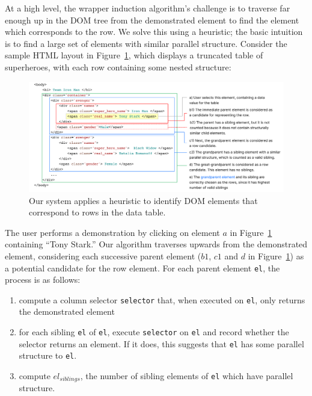 \documentclass[sigconf,10pt]{acmart}
\providecommand{\tightlist}{%
  \setlength{\itemsep}{0pt}\setlength{\parskip}{0pt}}
\begin{document}
At a high level, the wrapper induction algorithm's challenge is to
traverse far enough up in the DOM tree from the demonstrated element to
find the element which corresponds to the row. We solve this using a
heuristic; the basic intuition is to find a large set of elements with
similar parallel structure. Consider the sample HTML layout in
Figure~\ref{fig:algorithm}, which displays a truncated table of
superheroes, with each row containing some nested structure:

\begin{figure}
  \includegraphics[width=\textwidth]{media/algorithm.png}
  \caption{\label{fig:algorithm}Our system applies a heuristic to identify DOM elements that correspond to rows in the data table.}
\end{figure}

The user performs a demonstration by clicking on element \(a\) in
Figure~\ref{fig:algorithm} containing ``Tony Stark.'' Our algorithm
traverses upwards from the demonstrated element, considering each
successive parent element (\(b1\), \(c1\) and \(d\) in
Figure~\ref{fig:algorithm}) as a potential candidate for the row
element. For each parent element \texttt{el}, the process is as follows:

\begin{enumerate}
\def\labelenumi{\arabic{enumi}.}
\tightlist
\item
  compute a column selector \texttt{selector} that, when executed on
  \texttt{el}, only returns the demonstrated element
\item
  for each sibling \texttt{el\textquotesingle{}} of \texttt{el}, execute
  \texttt{selector} on \texttt{el\textquotesingle{}} and record whether
  the selector returns an element. If it does, this suggests that
  \texttt{el\textquotesingle{}} has some parallel structure to
  \texttt{el}.
\item
  compute \(el_{siblings}\), the number of sibling elements of
  \texttt{el} which have parallel structure.
\end{enumerate}
\end{document}
